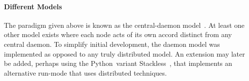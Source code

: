 \paragraph{Different Models}
The paradigm given above is known as the central-daemon model~\autocite{dew:sem}.
At least one other model exists where each node acts
  of its own accord distinct from any central daemon.
To simplify initial development, the daemon model was implemented
  as opposed to any truly distributed model.
An extension may later be added, perhaps using the Python~variant Stackless~\autocite{stackless},
  that implements an alternative run-mode that uses distributed techniques.

